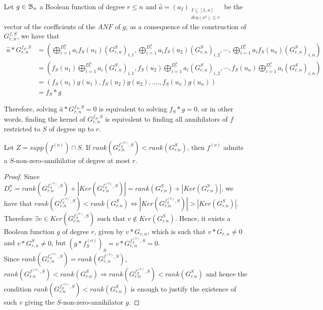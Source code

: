\documentclass[11pt]{llncs}
\begin{document}
\begin{remark}\label{rem:gfMatrix}
	Let $g \in \mathcal{B}_{n}$ a Boolean function of degree $r\leq n$ and $\hat{a} = \left(a_I\right)_{\substack{I \subseteq [1,n] \\ deg\left(x^I\right) \leq r}}$ be the vector of the coefficients of the $ANF$ of $g$, as a consequence of the construction of $G_{r,n}^{f,S}$, we have that
	\begin{equation}
	\begin{aligned}
	\hat{a} * G_{r,n}^{f_S,S} & = \left(\bigoplus_{i=1}^{D_r^n}a_i f_S(u_1)(G_{r,n}^S)_{i,1}, \bigoplus_{i=1}^{D_r^n}a_i f_S(u_2)(G_{r,n}^S)_{i,2}, \cdots, \bigoplus_{i=1}^{D_r^n}a_i f_S(u_n)(G_{r,n}^S)_{i,n}\right)     \\
	& =  \left(f_S(u_1) \bigoplus_{i=1}^{D_r^n}a_i (G_{r,n}^S)_{i,1}, f_S(u_2) \bigoplus_{i=1}^{D_r^n}a_i (G_{r,n}^S)_{i,2}, \cdots, f_S(u_n) \bigoplus_{i=1}^{D_r^n}a_i (G_{r,n}^S)_{i,n}\right) \\
	& = \left(f_S(u_1) g(u_1), f_S(u_2) g(u_2), ...., f_S(u_n) g(u_n)\right)                                                                                      \\
	& = f_S*g
	\end{aligned}
	\end{equation}
	
	Therefore, solving $ \hat{a} * G_{r,n}^{f_S,S} = 0$ is equivalent to solving $f_S*g = 0$, or in other words, finding the kernel of $G_{r,n}^{f_S,S}$ is equivalent to finding all annihilators of $f$ restricted to $S$ of degree up to $r$.
\end{remark}

\begin{proposition}\label{prop:compareranks}
	Let $Z = supp\left(f^{(o)}\right) \cap S$.
	If $rank\left(G^{f_{Z}^{(o)},S}_{r.n}\right) < rank(G^{S}_{r.n})$, then $f^{(o)}$ admits a $S$-non-zero-annihilator of degree at most $r$.
\end{proposition}
\begin{proof}
	Since $D_r^n = rank(G^{f^{(o)}_S,S}_{r.n}) + |Ker(G^{f^{(o)}_S,S}_{r.n})| =  rank(G^{S}_{r.n}) + |Ker(G^{S}_{r.n})|$, we have that
	$rank(G^{f_S^{(o)},S}_{r.n}) < rank(G^{S}_{r.n}) \iff |Ker(G^{f_S^{(o)},S}_{r.n})| > |Ker(G^{S}_{r.n})|$. Therefore $\exists v\in Ker(G^{f_S^{(o)},S}_{r.n}) \mbox{ such that }v\not\in Ker(G^{S}_{r.n})$. Hence, it exists a Boolean function $g$ of degree $r$, given by $v*G_{r,n}$, which is such that $v*G_{r,n}\neq 0$ and $v*G_{r,n}^{S}\neq 0$, but $(g*f_S^{(o)})_S = v*G_{r,n}^{f_S^{(o)},S} = 0$.\\
	Since $rank\left(G_{r,n}^{f_S^{(o)}, S}\right) = rank\left(G_{r,n}^{f^{(o)}, S}\right)$, $rank(G^{f^{(o)},S}_{r.n}) < rank(G^{S}_{r.n}) \Rightarrow rank(G^{f_Z^{(o)},S}_{r.n}) < rank(G^{S}_{r.n})$ and hence the condition $rank(G^{f_Z^{(o)},S}_{r.n}) < rank(G^{S}_{r.n})$ is enough to justify the existence of such $v$ giving the $S$-non-zero-annihilator $g$.
\end{proof}
\end{document}
